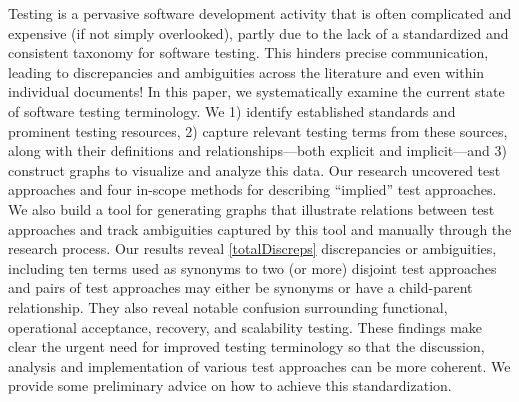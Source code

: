 \label{abstract}%
Testing is a pervasive software development activity that is often
complicated and expensive (if not simply overlooked), partly due to
the lack of a standardized and consistent taxonomy for software testing.
This hinders precise communication, leading to discrepancies and
ambiguities across the literature and even within individual documents!
In this paper, we systematically examine the current state of software
testing terminology. We 1) identify established standards
and prominent testing resources, 2) capture relevant testing terms
from these sources, along with their definitions and relationships---both
explicit and implicit---and 3) construct graphs to visualize and analyze
this data. Our research uncovered \approachCount{} test approaches and
four in-scope methods for describing ``implied'' test approaches. We also build
a tool for generating graphs that illustrate relations between test
approaches and track ambiguities captured by this tool and manually through
the research process. Our results reveal \ref*{totalDiscreps} discrepancies
or ambiguities, including ten terms used as synonyms to two (or more)
disjoint test approaches and \parSynCount{} pairs of test approaches may
either be synonyms or have a child-parent relationship. They also reveal
notable confusion surrounding functional, operational acceptance, recovery,
and scalability testing. These findings make clear
the urgent need for improved testing terminology so that the discussion,
analysis and implementation of various test approaches can be more coherent.
We provide some preliminary advice on how to achieve this standardization.